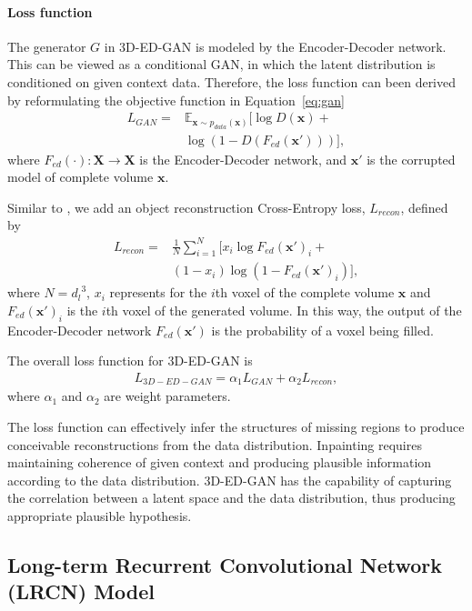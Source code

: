 \documentclass[10pt,twocolumn,letterpaper]{article}
\begin{document}
\paragraph*{Loss function} The generator $G$ in 3D-ED-GAN is modeled by the Encoder-Decoder network. This can be viewed as a conditional GAN, in which the latent distribution is conditioned on given context data. Therefore, the loss function can been derived by reformulating the objective function in Equation~\ref{eq:gan}
  \begin{align}
L_{GAN}= &\mathbb{E}_{\mathbf{x} \sim p_{data}(\mathbf{x})}[\log D(\mathbf{x})+ \nonumber\\
&\log (1-D(F_{ed}(\mathbf{x}')))], \label{eq:3dgan}
  \end{align}
where $F_{ed}(\cdot): \mathbf{X} \rightarrow \mathbf{X}$ is the Encoder-Decoder network, and $\mathbf{x}'$ is the corrupted model of complete volume $\mathbf{x}$.

Similar to \cite{contextencoder}, we add an object reconstruction Cross-Entropy loss, $L_{recon}$, defined by
  \begin{align}
L_{recon}= &\frac{1}{N}\sum_{i=1}^{N} [x_{i} \log F_{ed}(\mathbf{x}')_{i} +\nonumber\\
&(1-x_{i}) \log (1-F_{ed}(\mathbf{x}')_{i})], \label{eq:recon}
  \end{align}
where $N={d_l}^3$, $x_{i}$ represents for the $i$th voxel of the complete volume $\mathbf{x}$ and $F_{ed}(\mathbf{x}')_{i}$ is the $i$th voxel of the generated volume. In this way, the output of the Encoder-Decoder network $F_{ed}(\mathbf{x}')$ is the probability of a voxel being filled.

The overall loss function for 3D-ED-GAN is
  \begin{align}
L_{3D-ED-GAN} = \alpha_1 L_{GAN} + \alpha_2 L_{recon},
  \end{align}
where $\alpha_1$ and $\alpha_2$ are weight parameters.

The loss function can effectively infer the structures of missing regions to produce conceivable reconstructions from the data distribution. Inpainting requires maintaining coherence of given context and producing plausible information according to the data distribution. 3D-ED-GAN has the capability of capturing the correlation between a latent space and the data distribution, thus producing appropriate plausible hypothesis.
\subsection{Long-term Recurrent Convolutional Network (LRCN) Model}
\label{sec:LRCN}
\end{document}
